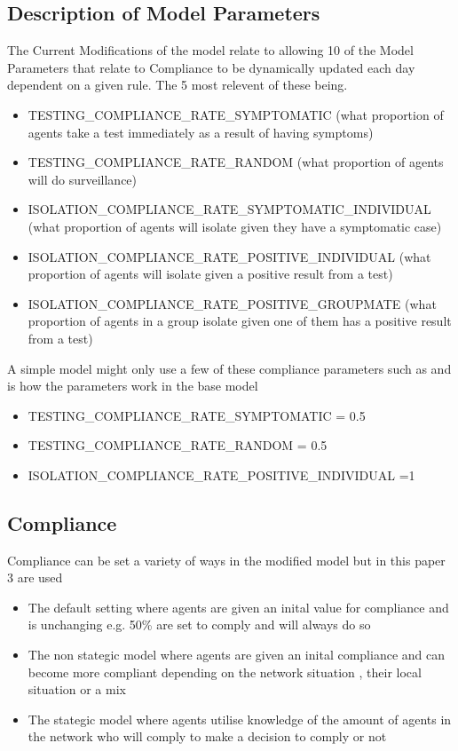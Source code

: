 \documentclass{article}
\begin{document}
\subsection{Description of Model Parameters}
The Current Modifications of the model relate to allowing 10 of the Model Parameters that relate to Compliance to be dynamically updated each day dependent on a given rule. The 5 most relevent of these being.
\begin{itemize}
\item TESTING\_COMPLIANCE\_RATE\_SYMPTOMATIC (what proportion of agents take a test immediately as a result of having symptoms)
\item TESTING\_COMPLIANCE\_RATE\_RANDOM  (what proportion of agents will do surveillance)
\item ISOLATION\_COMPLIANCE\_RATE\_SYMPTOMATIC\_INDIVIDUAL (what proportion of agents will isolate given they have a symptomatic case)
\item ISOLATION\_COMPLIANCE\_RATE\_POSITIVE\_INDIVIDUAL (what proportion of agents will isolate given a positive result from a test)
\item ISOLATION\_COMPLIANCE\_RATE\_POSITIVE\_GROUPMATE (what proportion of agents in a group isolate given one of them has a positive result from a test)
\end{itemize}

A simple model might only use a few of these compliance parameters such as  and is how the parameters work in the base model
\begin{itemize}
\item TESTING\_COMPLIANCE\_RATE\_SYMPTOMATIC = 0.5\
\item TESTING\_COMPLIANCE\_RATE\_RANDOM = 0.5
\item ISOLATION\_COMPLIANCE\_RATE\_POSITIVE\_INDIVIDUAL =1
\end{itemize}


\subsection{Compliance}
Compliance can be set a variety of ways in the modified model but in this paper 3 are used
\begin{itemize}
\item The default setting where agents are given an inital value for compliance and is unchanging e.g. 50\% are set to comply and will always do so
\item The non stategic model where agents are given an inital compliance and can become more compliant depending on the network situation , their local situation or a mix
\item The stategic model where agents utilise knowledge of the amount of agents in the network who will comply to make a decision to comply or not
\end{itemize}
\end{document}
